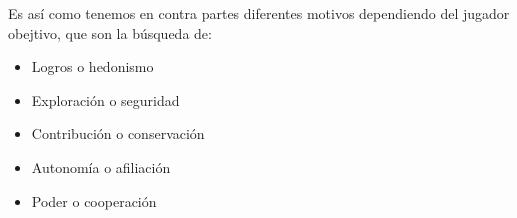 Es así como tenemos en contra partes diferentes motivos dependiendo del jugador obejtivo, que son la búsqueda de:
\begin{itemize}
	\item Logros o hedonismo
	\item Exploración o seguridad
	\item Contribución o conservación
	\item Autonomía o afiliación
	\item Poder o cooperación
\end{itemize}
 
 
 
